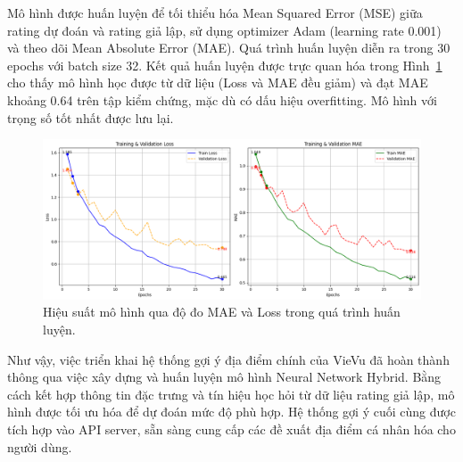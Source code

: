 Mô hình được huấn luyện để tối thiểu hóa Mean Squared Error (MSE) giữa rating dự đoán và rating giả lập, sử dụng optimizer Adam (learning rate 0.001) và theo dõi Mean Absolute Error (MAE). Quá trình huấn luyện diễn ra trong 30 epochs với batch size 32. Kết quả huấn luyện được trực quan hóa trong Hình~\ref{fig:mae} cho thấy mô hình học được từ dữ liệu (Loss và MAE đều giảm) và đạt MAE khoảng 0.64 trên tập kiểm chứng, mặc dù có dấu hiệu overfitting. Mô hình với trọng số tốt nhất được lưu lại. %
    \begin{figure}[H]
        \centering
        \includegraphics[width=\textwidth]{figures/c4/128.png} %
        \caption{Hiệu suất mô hình qua độ đo MAE và Loss trong quá trình huấn luyện.} %
        \label{fig:mae} %
    \end{figure}

Như vậy, việc triển khai hệ thống gợi ý địa điểm chính của VieVu đã hoàn thành thông qua việc xây dựng và huấn luyện mô hình Neural Network Hybrid. Bằng cách kết hợp thông tin đặc trưng và tín hiệu học hỏi từ dữ liệu rating giả lập, mô hình được tối ưu hóa để dự đoán mức độ phù hợp. Hệ thống gợi ý cuối cùng được tích hợp vào API server, sẵn sàng cung cấp các đề xuất địa điểm cá nhân hóa cho người dùng.
